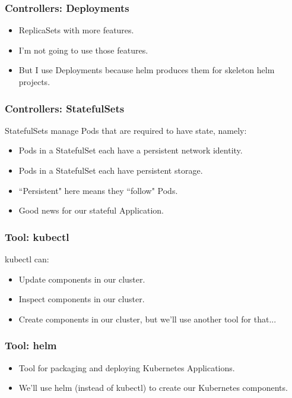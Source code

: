     \begin{frame}
        \frametitle{Controllers: Deployments}
        \begin{itemize}
            \item ReplicaSets with more features.\pause
            \item I'm not going to use those features.\pause
            \item But I use Deployments because helm produces them for skeleton helm projects.
        \end{itemize}
    \end{frame}

    \begin{frame}
        \frametitle{Controllers: StatefulSets}
        StatefulSets manage Pods that are required to have state, namely:\pause
        \begin{itemize}
            \item Pods in a StatefulSet each have a persistent network identity.\pause
            \item Pods in a StatefulSet each have persistent storage.\pause
            \item ``Persistent" here means they ``follow" Pods.\pause
            \item Good news for our stateful Application.
        \end{itemize}
    \end{frame}

    \begin{frame}
        \frametitle{Tool: kubectl\footnotemark}
        kubectl can:
        \begin{itemize}
            \item Update components in our cluster.\pause
            \item Inspect components in our cluster.\pause
            \item Create components in our cluster, but we'll use another tool for that...
        \end{itemize}
    \end{frame}

    \begin{frame}
        \frametitle{Tool: helm\footnotemark}
        \begin{itemize}
            \item Tool for packaging and deploying Kubernetes Applications.
            \item We'll use helm (instead of kubectl) to create our Kubernetes components.
        \end{itemize}
    \end{frame}

